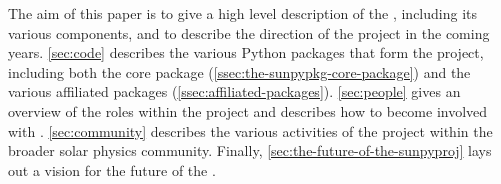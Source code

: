 The aim of this paper is to give a high level description of the \sunpyproj, including its various components, and to describe the direction of the project in the coming years.
\autoref{sec:code} describes the various Python packages that form the project, including both the \sunpypkg core package (\autoref{ssec:the-sunpypkg-core-package}) and the various affiliated packages (\autoref{ssec:affiliated-packages}).
\autoref{sec:people} gives an overview of the roles within the project and describes how to become involved with \sunpyproj.
\autoref{sec:community} describes the various activities of the project within the broader solar physics community.
Finally, \autoref{sec:the-future-of-the-sunpyproj} lays out a vision for the future of the \sunpyproj.
